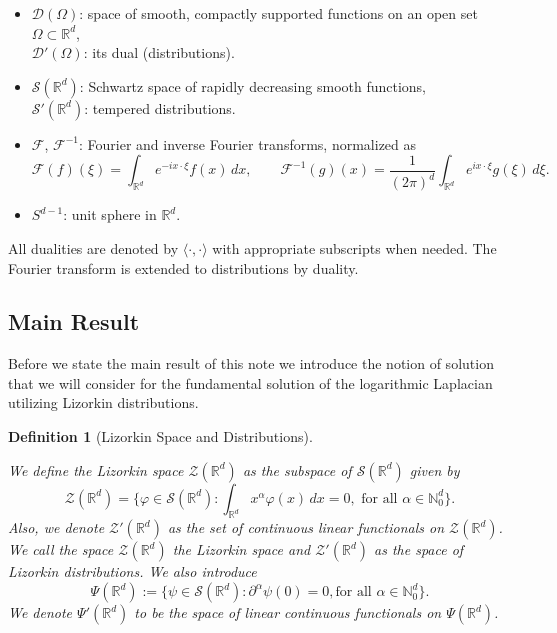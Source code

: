\documentclass[11pt]{amsart}
\newcommand{\R}{\mathbb{R}}
\newcommand{\N}{\mathbb{N}}
\newtheorem{definition}{Definition}
\begin{document}
\begin{itemize}
	\item $\mathcal{D}(\Omega)$: space of smooth, compactly supported functions on an open set $\Omega\subset \R^d$, \\
	$\mathcal{D}'(\Omega)$: its dual (distributions).
	\item $\mathcal{S}(\R^d)$: Schwartz space of rapidly decreasing smooth functions, \\
	$\mathcal{S}'(\R^d)$: tempered distributions.
	\item $\mathcal{F}$, $\mathcal{F}^{-1}$: Fourier and inverse Fourier transforms, normalized as
	\begin{equation*}
		\mathcal{F}(f)(\xi) = \int_{\R^d} e^{-ix\cdot\xi} f(x)\,dx, \qquad
		\mathcal{F}^{-1}(g)(x) = \frac{1}{(2\pi)^d} \int_{\R^d} e^{ix\cdot\xi} g(\xi)\,d\xi.
		\end{equation*}
	\item $S^{d-1}$: unit sphere in $\R^d$. 
\end{itemize}

All dualities are denoted by $\langle \cdot, \cdot \rangle$ with appropriate subscripts when needed. The Fourier transform is extended to distributions by duality. 

\subsection{Main Result}
Before we state the main result of this note we introduce the notion of solution that we will consider for the fundamental solution of the logarithmic Laplacian utilizing Lizorkin distributions. 

\begin{definition}[Lizorkin Space and Distributions]\label{def:distributions}

We define the Lizorkin space $\mathcal{Z}(\mathbb{R}^d)$ as the subspace of $\mathcal{S}(\mathbb{R}^d)$ given by
	\begin{equation*}
	\mathcal{Z}(\mathbb{R}^d)=\{\varphi\in \mathcal{S}(\mathbb{R}^d):\int_{\mathbb{R}^d}x^{\alpha}\varphi(x)\,dx=0, \text{ for all $\alpha \in \mathbb{N}^{d}_{0}$}\}.
	\end{equation*}
	Also, we denote 
	$\mathcal{Z}'(\mathbb{R}^d)$ as the set of continuous linear functionals on $\mathcal{Z}(\mathbb{R}^d)$. We call the space $\mathcal{Z}(\mathbb{R}^d)$ the Lizorkin space and $\mathcal{Z}'(\mathbb{R}^d)$ as the space of Lizorkin distributions. We also introduce
\begin{equation*}
		\Psi(\R^d):=\{\psi \in \mathcal{S}(\R^d):\partial^\alpha \psi(0)=0, \text{for all $\alpha \in \N^d_0$}\}.
	\end{equation*}
	We denote $\Psi'(\R^d)$ to be the space of linear continuous functionals on $\Psi(\R^d)$.
\end{definition}
\end{document}
